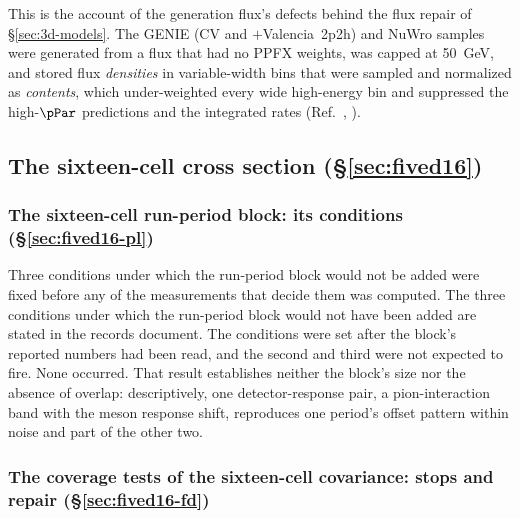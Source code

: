 This is the account of the generation flux's defects behind the flux repair of \S\ref{sec:3d-models}. The GENIE (CV and $+$Valencia~2p2h) and NuWro samples were generated from a flux that had no PPFX weights, was capped at \SI{50}{GeV}, and stored flux \emph{densities} in variable-width bins that were sampled and normalized as \emph{contents}, which under-weighted every wide high-energy bin and suppressed the high-$\pPar$ predictions and the integrated rates (Ref.~\cite{NoteRecords2026}, ).

\subsection{The sixteen-cell cross section (\S\ref{sec:fived16})}
\label{app:devhistory-fived16}

\subsubsection{The sixteen-cell run-period block: its conditions (\S\ref{sec:fived16-pl})}
\label{app:devhistory-fived16pl}

Three conditions under which the run-period block would not be added were fixed before any of the measurements that decide them was computed. The three conditions under which the run-period block would not have been added are stated in the records document. The conditions were set after the block's reported numbers had been read, and the second and third were not expected to fire. None occurred. That result establishes neither the block's size nor the absence of overlap: descriptively, one detector-response pair, a pion-interaction band with the meson response shift, reproduces one period's offset pattern within noise and part of the other two.

\subsubsection{The coverage tests of the sixteen-cell covariance: stops and repair (\S\ref{sec:fived16-fd})}
\label{app:devhistory-fived16cov}

